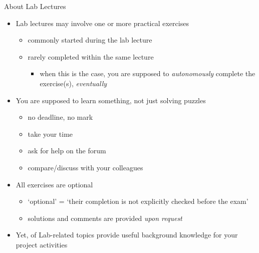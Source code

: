 \documentclass[presentation]{beamer}\mode<presentation>{\usetheme{AMSBolognaFC}}
\begin{document}
\begin{frame}[c,allowframebreaks]{About Lab Lectures}

    \begin{itemize}

        \item Lab lectures may involve one or more practical exercises
        \begin{itemize}
            \item commonly started during the lab lecture
            \item rarely completed within the same lecture
			\begin{itemize}
				\item[!] when this is the case, you are supposed to \emph{autonomously} complete the exercise(s), \emph{eventually}
			\end{itemize}
        \end{itemize}

        \bigskip

        \item You are supposed to learn something, not just solving puzzles
        \begin{itemize}
            \item no deadline, no mark
            \item[$\rightarrow$] take your time
            \item[$\rightarrow$] ask for help on the forum
            \item[$\rightarrow$] compare/discuss with your colleagues
        \end{itemize}

        \bigskip

        \item \alert{All} exercises are \alert{optional}
        \begin{itemize}
			\item `optional' = `their completion is not explicitly checked before the exam'
            \item solutions and comments are provided \emph{upon request}
        \end{itemize}

        \framebreak

        \item Yet, of Lab-related topics provide useful background knowledge for your project activities

        \bigskip


\end{itemize}
\end{frame}
\end{document}

